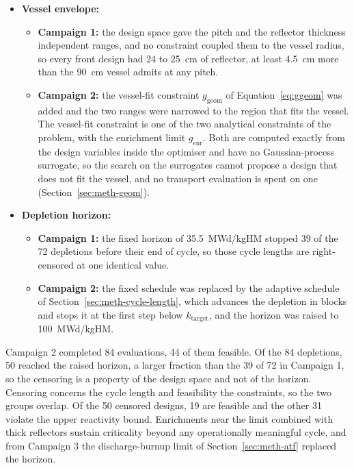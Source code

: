 \begin{itemize}
  \item \textbf{Vessel envelope:}
        \begin{itemize}
          \item \textbf{Campaign 1:} the design space gave the pitch and
                the reflector thickness independent ranges, and no
                constraint coupled them to the vessel radius, so every
                front design had 24 to \SI{25}{cm} of reflector, at
                least \SI{4.5}{cm} more than the \SI{90}{cm} vessel
                admits at any pitch.

          \item \textbf{Campaign 2:} the vessel-fit constraint
                $g_\mathrm{geom}$ of Equation~\eqref{eq:ggeom} was added
                and the two ranges were narrowed to the region that fits
                the vessel. The vessel-fit constraint is one of the two
                analytical constraints of the problem, with the
                enrichment limit $g_\mathrm{enr}$. Both are computed
                exactly from the design variables inside the optimiser
                and have no Gaussian-process surrogate, so the search on
                the surrogates cannot propose a design that does not fit
                the vessel, and no transport evaluation is spent on one
                (Section~\ref{sec:meth-geom}).
        \end{itemize}

  \item \textbf{Depletion horizon:}
        \begin{itemize}
          \item \textbf{Campaign 1:} the fixed horizon of
                \SI{35.5}{MWd/kgHM} stopped 39 of the 72 depletions
                before their end of cycle, so those cycle lengths are
                right-censored at one identical value.

          \item \textbf{Campaign 2:} the fixed schedule was replaced by
                the adaptive schedule of
                Section~\ref{sec:meth-cycle-length}, which advances the
                depletion in blocks and stops it at the first step below
                $k_\mathrm{target}$, and the horizon was raised to
                \SI{100}{MWd/kgHM}.
        \end{itemize}
\end{itemize}

Campaign 2 completed 84 evaluations, 44 of them feasible. Of the 84
depletions, 50 reached the raised horizon, a larger fraction than the 39
of 72 in Campaign 1, so the censoring is a property of the design space
and not of the horizon. Censoring concerns the cycle length and
feasibility the constraints, so the two groups overlap. Of the 50
censored designs, 19 are feasible and the other 31 violate the upper
reactivity bound. Enrichments near the limit combined with thick
reflectors sustain criticality beyond any operationally meaningful
cycle, and from Campaign 3 the discharge-burnup limit of
Section~\ref{sec:meth-atf} replaced the horizon.

